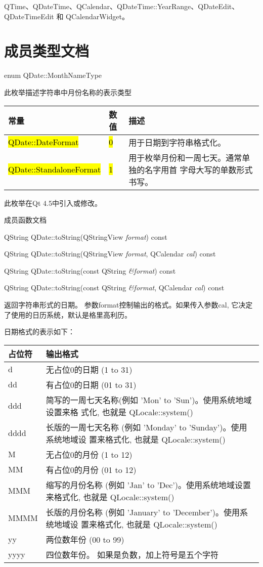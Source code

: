 \begin{notice}[另请参阅]
QTime、QDateTime、QCalendar、QDateTime::YearRange、QDateEdit、QDateTimeEdit 和 QCalendarWidget。
\end{notice}


\splitLine

\section{成员类型文档}

enum QDate::MonthNameType

此枚举描述字符串中月份名称的表示类型

\begin{tabular}{|l|l|m{20em}|}
\hline
常量	&数值&	描述\\
\hline
\hl{QDate::DateFormat}&	\hl{0}&	用于日期到字符串格式化。\\
\hline
\hl{QDate::StandaloneFormat}	&\hl{1}&	用于枚举月份和一周七天。通常单独的名字用首
  字母大写的单数形式书写。\\
\hline
\end{tabular}

此枚举在Qt 4.5中引入或修改。

\splitLine

成员函数文档

QString QDate::toString(QStringView \emph{format}) const

QString QDate::toString(QStringView \emph{format}, QCalendar \emph{cal}) const

QString QDate::toString(const QString \emph{\&format}) const

QString QDate::toString(const QString \emph{\&format}, QCalendar \emph{cal}) const

返回字符串形式的日期。 参数format控制输出的格式。如果传入参数cal, 它决定了使用的日历系统，默认是格里高利历。

日期格式的表示如下：

\begin{tabular}{|l|m{30em}|}
\hline
占位符 &	输出格式\\
\hline
d&	无占位0的日期 (1 to 31)\\
\hline
dd&	有占位0的日期 (01 to 31)\\
\hline
ddd&	简写的一周七天名称(例如 'Mon' to 'Sun')。使用系统地域设置来格
     式化, 也就是 QLocale::system()\\
\hline
dddd&	长版的一周七天名称 (例如 'Monday' to 'Sunday')。使用系统地域设
      置来格式化, 也就是 QLocale::system()\\
\hline
M&	无占位0的月份 (1 to 12)\\
\hline
MM&	有占位0的月份 (01 to 12)\\
\hline
MMM&	缩写的月份名称 (例如 'Jan' to 'Dec')。使用系统地域设置来格式化,
     也就是 QLocale::system()\\
\hline
MMMM&	长版的月份名称 (例如 'January' to 'December')。使用系统地域设
      置来格式化, 也就是 QLocale::system()\\
\hline
yy&	两位数年份 (00 to 99)\\
\hline
yyyy&	四位数年份。 如果是负数，加上符号是五个字符\\
\hline
\end{tabular}

